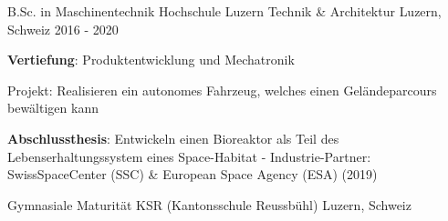

\begin{cventries}

\cventry
{B.Sc. in Maschinentechnik} %
{Hochschule Luzern Technik \& Architektur} %
{Luzern, Schweiz} %
{2016 - 2020} %
{
	\begin{cvitems} %
		\item {\textbf{Vertiefung}: Produktentwicklung und Mechatronik}
		\item {Projekt: Realisieren ein autonomes Fahrzeug, welches einen Geländeparcours bewältigen kann}
		\item {\textbf{Abschlussthesis}: Entwickeln einen Bioreaktor als Teil des Lebenserhaltungssystem eines Space-Habitat - Industrie-Partner: \mbox{SwissSpaceCenter} (SSC) \& European Space Agency (ESA) (2019)}
	\end{cvitems}
}



  \cventry
    {Gymnasiale Maturität} %
    {KSR (Kantonsschule Reussbühl)} %
    {Luzern, Schweiz} %
    {} %
    {
    }

\end{cventries}
